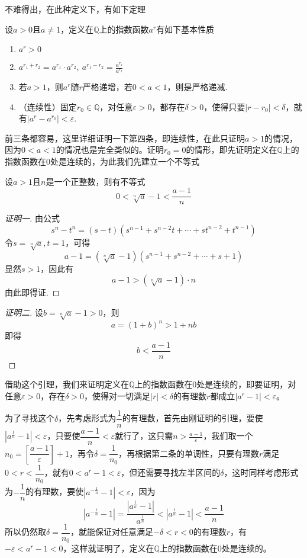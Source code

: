 不难得出，在此种定义下，有如下定理
\begin{theorem}
  设$a>0$且$a \neq 1$，定义在$\mathbb{Q}$上的指数函数$a^r$有如下基本性质
\begin{enumerate}
\item $a^r>0$
\item $a^{r_1+r_2}=a^{r_1}\cdot a^{r_2}, \ a^{r_1-r_2} = \frac{a^{r_1}}{a^{r_2}} $
\item 若$a>1$，则$a^r$随$r$严格递增，若$0<a<1$，则是严格递减.
\item （连续性）固定$r_0\in \mathbb{Q}$，对任意$\varepsilon>0$，都存在$\delta>0$，使得只要$|r-r_0|<\delta$，就有$|a^r-a^{r_0}|<\varepsilon$.
\end{enumerate}
\end{theorem}

前三条都容易，这里详细证明一下第四条，即连续性，在此只证明$a>1$的情况，因为$0<a<1$的情况也是完全类似的。证明$r_0=0$的情形，即先证明定义在$\mathbb{Q}$上的指数函数在$0$处是连续的，为此我们先建立一个不等式
\begin{lemma}
  设$a>1$且$n$是一个正整数，则有不等式
  \[ 0< \sqrt[n]{a}-1 < \frac{a-1}{n} \]
\end{lemma}

\begin{proof}[证明一]
  由公式
  \[ s^n-t^n=(s-t)(s^{n-1}+s^{n-2}t+\cdots+st^{n-2}+t^{n-1}) \]
  令$s=\sqrt[n]{a},t=1$，可得
  \[ a-1=(\sqrt[n]{a}-1)(s^{n-1}+s^{n-2}+\cdots+s+1) \]
  显然$s>1$，因此有
  \[ a-1> (\sqrt[n]{a}-1) \cdot n\]
  由此即得证.
\end{proof}

\begin{proof}[证明二]
  设$b=\sqrt[n]{a}-1>0$，则
  \[ a = (1+b)^n > 1 + nb \]
  即得
  \[ b < \frac{a-1}{n} \]
\end{proof}

借助这个引理，我们来证明定义在$\mathbb{Q}$上的指数函数在0处是连续的，即要证明，对任意$\varepsilon>0$，存在$\delta>0$，使得对一切满足$|r|<\delta$的有理数$r$都成立$|a^r-1|<\varepsilon$。

为了寻找这个$\delta$，先考虑形式为$\dfrac{1}{n}$的有理数，首先由刚证明的引理，要使$|a^{\frac{1}{n}}-1|<\varepsilon$，只要使$\dfrac{a-1}{n}<\varepsilon$就行了，这只需$n>\frac{a-1}{\varepsilon}$，我们取一个$n_0 = \left[ \dfrac{a-1}{\varepsilon} \right]+1$，再令$\delta=\dfrac{1}{n_0}$，再根据第二条的单调性，只要有理数$r$满足$0<r<\dfrac{1}{n_0}$，就有$0<a^r-1<\varepsilon$，但还需要寻找左半区间的$\delta$，这时同样考虑形式为$-\dfrac{1}{n}$的有理数，要使$|a^{-\frac{1}{n}}-1|<\varepsilon$，因为
\[ |a^{-\frac{1}{n}}-1|=\frac{|a^{\frac{1}{n}}-1|}{a^{\frac{1}{n}}} < |a^{\frac{1}{n}}-1| < \frac{a-1}{n} \]
所以仍然取$\delta=\dfrac{1}{n_0}$，就能保证对任意满足$-\delta<r<0$的有理数$r$，有$-\varepsilon<a^r-1<0$，这样就证明了，定义在$\mathbb{Q}$上的指数函数在$0$处是连续的。

